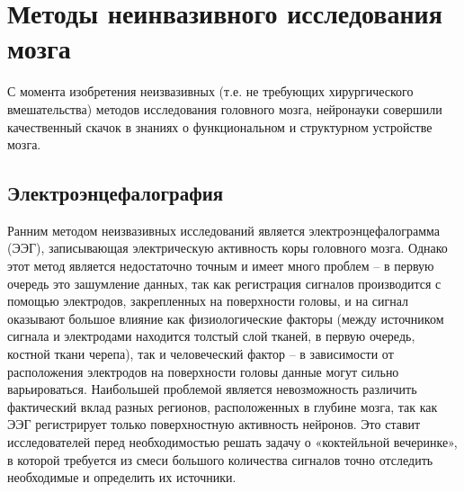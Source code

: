 \chapter{Методы неинвазивного исследования мозга}
С момента изобретения неизвазивных (т.е. не требующих хирургического вмешательства) методов исследования головного мозга, нейронауки совершили качественный скачок в знаниях о функциональном и структурном устройстве мозга. 
\section{Электроэнцефалография}
\indent Ранним методом неизвазивных исследований является электроэнцефалограмма (ЭЭГ), записывающая электрическую активность коры головного мозга. Однако этот метод является недостаточно точным и имеет много проблем – в первую очередь это зашумление данных, так как регистрация сигналов производится с помощью электродов, закрепленных на поверхности головы, и на сигнал оказывают большое влияние как физиологические факторы (между источником сигнала и электродами находится толстый слой тканей, в первую очередь, костной ткани черепа), так и человеческий фактор – в зависимости от расположения электродов на поверхности головы данные могут сильно варьироваться. Наибольшей проблемой является невозможность различить фактический вклад разных регионов, расположенных в глубине мозга, так как ЭЭГ регистрирует только поверхностную активность нейронов. Это ставит исследователей перед необходимостью решать задачу о «коктейльной вечеринке», в которой требуется из смеси большого количества сигналов точно отследить необходимые и определить их источники.

